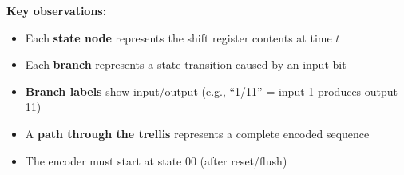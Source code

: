 % 
% 
% 
% 
% 
% 
% 
% 
% 

\textbf{Key observations:}
\begin{itemize}
\item Each \textbf{state node} represents the shift register contents at time $t$
\item Each \textbf{branch} represents a state transition caused by an input bit
\item \textbf{Branch labels} show input/output (e.g., ``1/11'' = input 1 produces output 11)
\item A \textbf{path through the trellis} represents a complete encoded sequence
\item The encoder must start at state 00 (after reset/flush)
\end{itemize}

